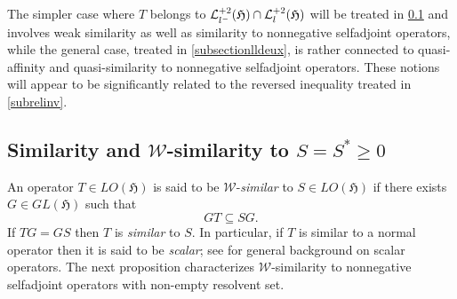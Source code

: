 \documentclass{amsart}
\newcommand{\h}{\mathfrak{H}}
\newcommand{\adj}{^*}
\newcommand{\inclu}{\subseteq}
\newcommand{\ldeux}{\mathcal{L}_l^{+2}(\h)}
\newcommand{\lldeux}{\mathcal{L}_{{l}^{\tiny-}}^{+2}(\h)}
\numberwithin{equation}{section}
\begin{document}
The simpler case where $T$ belongs to $\lldeux  \cap  \ldeux$  will be treated in \cref{wsimilsec} and involves  weak similarity as well as   similarity  to nonnegative selfadjoint operators, while the general case, treated in \cref{subsectionlldeux}, is rather connected to   quasi-affinity and quasi-similarity to nonnegative selfadjoint operators. These notions will appear to be significantly related to the reversed inequality treated in \cref{subrelinv}.\\



\subsection{Similarity and $\mathcal{W}$-similarity to $S=S\adj \geq 0$ } \label{wsimilsec}

An operator $T \in LO(\h)$ is said to be $\mathcal{W}$-\emph{similar}  to $S \in LO(\h)$ if there exists $G \in GL(\h)$   such that $$
GT \inclu SG.
$$
If $TG=GS$  then $T$ is \emph{similar} to $S.$  In particular, if $T$ is similar to a normal  operator then it is said to be \emph{scalar}; see    \cite{bade1954unbounded, dunfordthree,scalar} for general background on scalar operators.  The next proposition  characterizes  $\mathcal{W}$-similarity to nonnegative selfadjoint operators with non-empty resolvent set.
\end{document}
